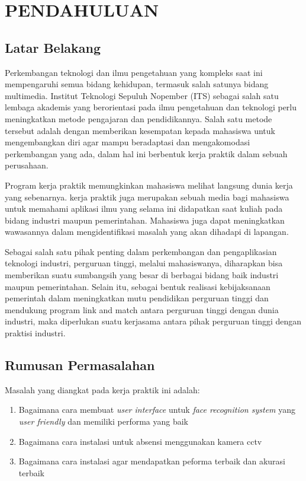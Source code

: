 \chapter{PENDAHULUAN}


\section{Latar Belakang}

  Perkembangan teknologi dan ilmu pengetahuan yang kompleks saat ini mempengaruhi semua bidang kehidupan, termasuk salah satunya bidang multimedia. Institut Teknologi Sepuluh Nopember (ITS) sebagai salah satu lembaga akademis yang berorientasi pada ilmu pengetahuan dan teknologi perlu meningkatkan metode pengajaran dan pendidikannya. Salah satu metode tersebut adalah dengan memberikan kesempatan kepada mahasiswa untuk mengembangkan diri agar mampu beradaptasi dan mengakomodasi perkembangan yang ada, dalam hal ini berbentuk kerja praktik dalam sebuah perusahaan.
  
  Program kerja praktik memungkinkan mahasiswa melihat langsung dunia kerja yang sebenarnya. kerja praktik juga merupakan sebuah media bagi mahasiswa untuk memahami aplikasi ilmu yang selama ini didapatkan saat kuliah pada bidang industri maupun pemerintahan. Mahasiswa juga dapat meningkatkan wawasannya dalam mengidentifikasi masalah yang akan dihadapi di lapangan.

  
  Sebagai salah satu pihak penting dalam perkembangan dan pengaplikasian teknologi industri, perguruan tinggi, melalui mahasiswanya, diharapkan bisa memberikan suatu sumbangsih yang besar di berbagai bidang baik industri maupun pemerintahan. Selain itu, sebagai bentuk realisasi kebijaksanaan pemerintah dalam meningkatkan mutu pendidikan perguruan tinggi dan mendukung program link and match antara perguruan tinggi dengan dunia industri, maka diperlukan suatu kerjasama antara pihak perguruan tinggi dengan praktisi industri.


\section{Rumusan Permasalahan}

Masalah yang diangkat pada kerja praktik ini adalah:

\begin{enumerate}[nolistsep]

  \item Bagaimana cara membuat \textit{user interface} untuk \textit{face recognition system} yang \textit{user friendly} dan memiliki performa yang baik
  
  \item Bagaimana cara instalasi  untuk absensi menggunakan kamera cctv

  \item Bagaimana cara instalasi  agar mendapatkan peforma terbaik dan akurasi terbaik

\end{enumerate}

